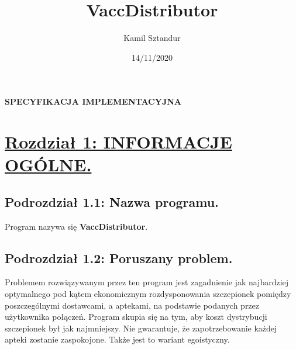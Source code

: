 \documentclass[a4paper]{article}
\title{\textbf{VaccDistributor}}
\author{Kamil Sztandur}
\date{14/11/2020}
\newcommand\tab[1][1cm]{\hspace*{#1}}
\begin{document}
\begin{tcolorbox}
\maketitle
\end{tcolorbox}
\centerline{\textbf{SPECYFIKACJA IMPLEMENTACYJNA}}
\newpage

\section*{\underline{Rozdział 1:  INFORMACJE OGÓLNE.}}
\subsection*{Podrozdział 1.1: Nazwa programu.}
\tab Program nazywa się \textbf{VaccDistributor}.

\subsection*{Podrozdział 1.2: Poruszany problem.}
\tab Problemem rozwiązywanym przez ten program jest zagadnienie jak najbardziej optymalnego pod kątem ekonomicznym rozdysponowania szczepionek pomiędzy poszczególnymi dostawcami, a aptekami, na podstawie podanych przez użytkownika połączeń. Program skupia się na tym, aby koszt dystrybucji szczepionek był jak najmniejszy. Nie gwarantuje, że zapotrzebowanie każdej apteki zostanie zaspokojone. Także jest to wariant egoistyczny.
\end{document}
